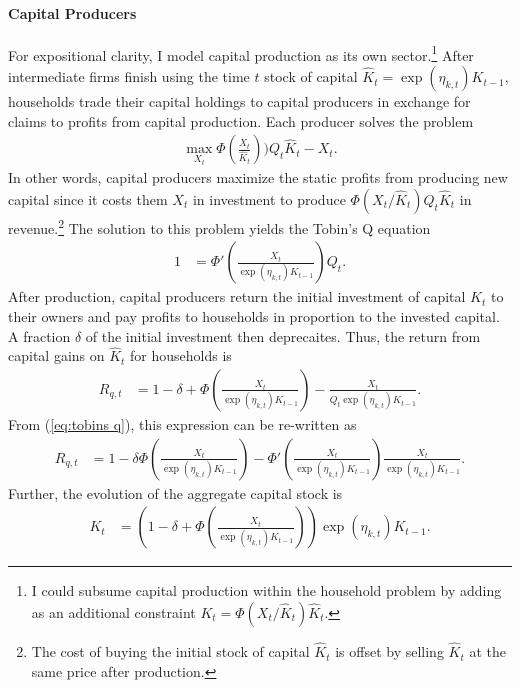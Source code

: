\documentclass[12 pt, oneside]{article}
\theoremstyle{definition}
\theoremstyle{definition}
\theoremstyle{definition}
\begin{document}
\paragraph{Capital Producers}
For expositional clarity, I model capital production as its own sector.\footnote{I could subsume capital production within the household problem by adding as an additional constraint $K_t = \Phi(X_t/\hat{K}_t)\hat{K}_t$.}
After intermediate firms finish using the time $t$ stock of capital $\hat{K}_t = \exp(\eta_{k, t})K_{t - 1}$,  households trade their capital holdings to capital producers in exchange for claims to profits from capital production. Each producer solves the problem
\begin{align}
  \max_{X_t} \Phi\left(\frac{X_t}{\hat{K}_t}\right))Q_t\hat{K}_t - X_t.
\end{align}
In other words, capital producers maximize the static profits from producing new capital since it costs them $X_t$ in investment to produce $\Phi(X_t / \hat{K}_t)Q_t \hat{K}_t$ in revenue.\footnote{The cost of buying the initial stock of capital $\hat{K}_t$ is offset by selling $\hat{K}_t$ at the same price after production.}
The solution to this problem yields the Tobin's Q equation
\begin{align}\label{eq:tobins q}
  1 & = \Phi'\left(\frac{X_t}{\exp(\eta_{k, t})K_{t - 1}}\right) Q_t.
\end{align}
After production, capital producers return the initial investment of capital $\hat{K}_t$ to their owners and pay profits to households in proportion to the invested capital. A fraction $\delta$ of the initial investment then deprecaites. Thus, the return from capital gains on $\hat{K}_t$ for households is
\begin{align*}
  R_{q, t} & = 1 - \delta + \Phi\left(\frac{X_t}{\exp(\eta_{k, t})K_{t - 1}}\right) - \frac{X_t}{Q_t \exp(\eta_{k, t})K_{t- 1}}.
\end{align*}
From (\ref{eq:tobins q}), this expression can be re-written as
\begin{align}\label{eq:Rq defn}
  R_{q, t} & = 1 - \delta \Phi\left(\frac{X_t}{\exp(\eta_{k, t})K_{t - 1}}\right) - \Phi'\left(\frac{X_t}{\exp(\eta_{k, t})K_{t - 1}}\right)\frac{X_t}{\exp(\eta_{k, t})K_{t - 1}}.
\end{align}
Further, the evolution of the aggregate capital stock is
\begin{align}
    \label{eq:capital accumulation equation}
  K_t & = \left(1 - \delta + \Phi\left(\frac{X_t}{\exp(\eta_{k, t})K_{t - 1}}\right)\right)\exp(\eta_{k, t})K_{t - 1}.
\end{align}
\end{document}
